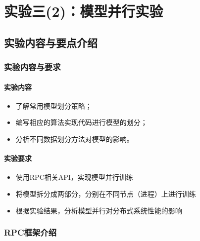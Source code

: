\chapter{实验三(2)：模型并行实验}

\section{实验内容与要点介绍}

\subsection{实验内容与要求}
\subsubsection{实验内容}
\begin{itemize}
    \item 了解常用模型划分策略；
    \item 编写相应的算法实现代码进行模型的划分；
    \item 分析不同数据划分方法对模型的影响。
\end{itemize}

\subsubsection{实验要求}
\begin{itemize}
    \item 使用RPC相关API，实现模型并行训练
    \item 将模型拆分成两部分，分别在不同节点（进程）上进行训练
    \item 根据实验结果，分析模型并行对分布式系统性能的影响
\end{itemize}

\subsection{RPC框架介绍}


